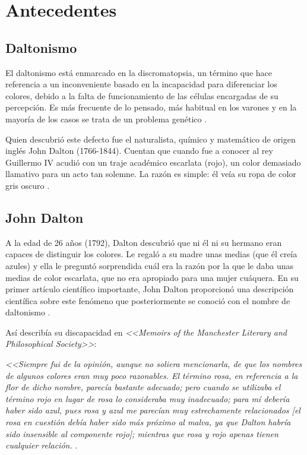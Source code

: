 \documentclass[10pt]{article}
\begin{document}
\section{Antecedentes}
\subsection{Daltonismo}
El daltonismo está enmarcado en la discromatopsia, un término que hace referencia a un inconveniente basado en la incapacidad para diferenciar los colores, debido a la falta de funcionamiento de las células encargadas de su percepción. Es más frecuente de lo pensado, más habitual en los varones y en la mayoría de los casos se trata de un problema genético \cite{IEEEreferencias:Ref1}\cite{IEEEreferencias:Ref2}.

\setlength{\parskip}{2mm}

Quien descubrió este defecto fue el naturalista, químico y matemático de origen inglés John Dalton (1766-1844).
Cuentan que cuando fue a conocer al rey Guillermo IV acudió con un traje académico escarlata (rojo), un color demasiado llamativo para un acto tan solemne. La razón es simple: él veía su ropa de color gris oscuro \cite{IEEEreferencias:Ref1}.

\subsection{John Dalton}

A la edad de 26 años (1792), Dalton descubrió que ni él ni su hermano eran capaces de distinguir los colores. Le regaló a su madre unas medias (que él creía azules) y ella le preguntó sorprendida cuál era la razón por la que le daba unas medias de color escarlata, que no era apropiado para una mujer cuáquera. En su primer artículo científico importante, John Dalton proporcionó una descripción científica sobre este fenómeno que posteriormente se conoció con el nombre de daltonismo \cite{IEEEreferencias:Ref1}.

\setlength{\parskip}{2mm}

Así describía su discapacidad en \textit{<<Memoirs of the Manchester Literary and Philosophical Society>>}:

\textit{<<Siempre fui de la opinión, aunque no soliera mencionarla, de que los nombres de algunos colores eran muy poco razonables. El término rosa, en referencia a la flor de dicho nombre, parecía bastante adecuado; pero cuando se utilizaba el término rojo en lugar de rosa lo consideraba muy inadecuado; para mí debería haber sido azul, pues rosa y azul me parecían muy estrechamente relacionados [el rosa en cuestión debía haber sido más próximo al malva, ya que Dalton habría sido insensible al componente rojo]; mientras que rosa y rojo apenas tienen cualquier relación. }.
\end{document}
